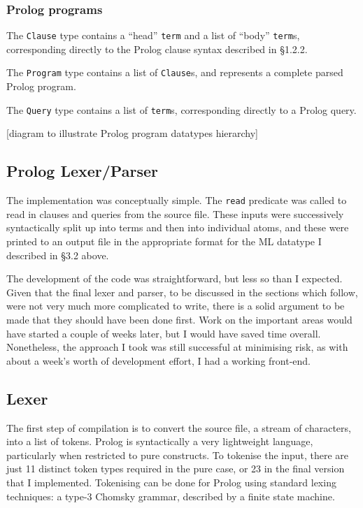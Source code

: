 \documentclass[12pt]{article}
\begin{document}
\subsubsection{Prolog programs}

The \verb|Clause| type contains a ``head'' \verb|term| and a list of ``body'' \verb|term|s, corresponding directly to the Prolog clause syntax described in \S1.2.2.

The \verb|Program| type contains a list of \verb|Clause|s, and represents a complete parsed Prolog program.

The \verb|Query| type contains a list of \verb|term|s, corresponding directly to a Prolog query.

[diagram to illustrate Prolog program datatypes hierarchy]

\subsection{Prolog Lexer/Parser}

The implementation was conceptually simple. 
The \verb|read| predicate was called to read in clauses and queries from the source file. 
These inputs were successively syntactically split up into terms and then into individual atoms, and these were printed to an output file in the appropriate format for the ML datatype I described in \S3.2 above.

The development of the code was straightforward, but less so than I expected. 
Given that the final lexer and parser, to be discussed in the sections which follow, were not very much more complicated to write, there is a solid argument to be made that they should have been done first.
Work on the important areas would have started a couple of weeks later, but I would have saved time overall.
Nonetheless, the approach I took was still successful at minimising risk, as with about a week's worth of development effort, I had a working front-end.

\subsection{Lexer}

The first step of compilation is to convert the source file, a stream of characters, into a list of tokens. 
Prolog is syntactically a very lightweight language, particularly when restricted to pure constructs. 
To tokenise the input, there are just 11 distinct token types required in the pure case, or 23 in the final version that I implemented. 
Tokenising can be done for Prolog using standard lexing techniques: a type-3 Chomsky grammar, described by a finite state machine. 
\end{document}
